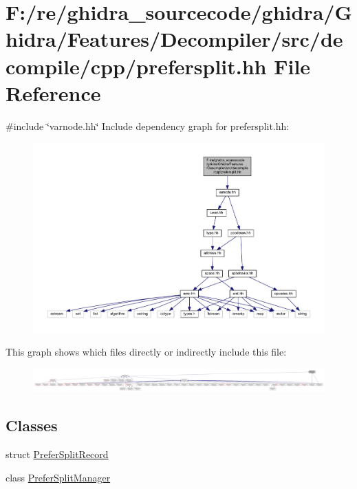 \hypertarget{prefersplit_8hh}{}\section{F\+:/re/ghidra\+\_\+sourcecode/ghidra/\+Ghidra/\+Features/\+Decompiler/src/decompile/cpp/prefersplit.hh File Reference}
\label{prefersplit_8hh}
{\ttfamily \#include \char`\"{}varnode.\+hh\char`\"{}}\newline
Include dependency graph for prefersplit.\+hh\+:
\nopagebreak
\begin{figure}[H]
\begin{center}
\leavevmode
\includegraphics[width=350pt]{prefersplit_8hh__incl}
\end{center}
\end{figure}
This graph shows which files directly or indirectly include this file\+:
\nopagebreak
\begin{figure}[H]
\begin{center}
\leavevmode
\includegraphics[width=350pt]{prefersplit_8hh__dep__incl}
\end{center}
\end{figure}
\subsection*{Classes}
\begin{DoxyCompactItemize}
\item 
struct \mbox{\hyperlink{struct_prefer_split_record}{Prefer\+Split\+Record}}
\item 
class \mbox{\hyperlink{class_prefer_split_manager}{Prefer\+Split\+Manager}}
\end{DoxyCompactItemize}
